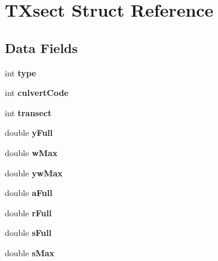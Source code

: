 \hypertarget{struct_t_xsect}{}\section{T\+Xsect Struct Reference}
\label{struct_t_xsect}
\subsection*{Data Fields}
\begin{DoxyCompactItemize}
\item 
\mbox{\label{struct_t_xsect_ac765329451135abec74c45e1897abf26}} 
int {\bfseries type}
\item 
\mbox{\label{struct_t_xsect_a10199794087ec1493aa94124346d2bf1}} 
int {\bfseries culvert\+Code}
\item 
\mbox{\label{struct_t_xsect_a2e1acf01993c882fadebf25f7419285c}} 
int {\bfseries transect}
\item 
\mbox{\label{struct_t_xsect_acb88aefbbf3fdd60eb4b725c342d17e3}} 
double {\bfseries y\+Full}
\item 
\mbox{\label{struct_t_xsect_a378b132b872409c20a0a561c988bbb37}} 
double {\bfseries w\+Max}
\item 
\mbox{\label{struct_t_xsect_ad7d5a780e668bbc84d9eaca258701b8f}} 
double {\bfseries yw\+Max}
\item 
\mbox{\label{struct_t_xsect_a9d2890c5999b2fbb9a446f7c101a5b6d}} 
double {\bfseries a\+Full}
\item 
\mbox{\label{struct_t_xsect_adc6257ea0cf58dc33e2bd95ba6e72e44}} 
double {\bfseries r\+Full}
\item 
\mbox{\label{struct_t_xsect_a64232f6bff0a64cb098558f094d638f9}} 
double {\bfseries s\+Full}
\item 
\mbox{\label{struct_t_xsect_a00e62bf08cf9aebdc0f40da1c6ea8595}} 
double {\bfseries s\+Max}
\item 
\mbox{\label{struct_t_xsect_ab32ea51ab9e0443aef84e78654325fe0}} 

\end{DoxyCompactItemize}
